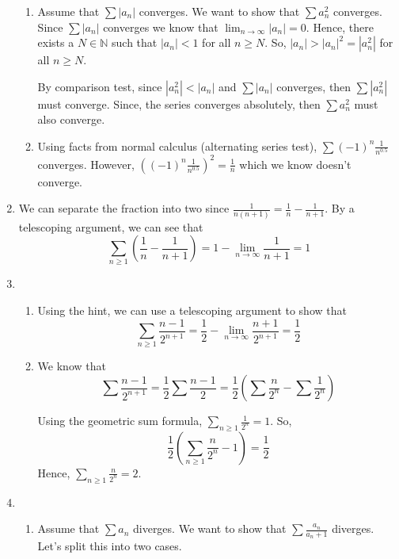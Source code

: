 \documentclass[12pt]{article}
\begin{document}
\begin{enumerate}[start=1,label={\bfseries Problem \arabic*:},leftmargin=1in]
\begin{enumerate}
        \item Assume that $\sum\left| a_{n} \right|$ converges. We want to show that $\sum a_{n}^2$ converges. 
        Since $\sum |a_{n}|$ converges we know that $\lim_{n \to \infty} \left| a_{n} \right| = 0$. Hence, there exists a $N \in \mathbb{N}$ such that $\left| a_{n} \right| < 1$ for all $n \geq N$. 
        So, $|a_{n}| > |a_{n}|^{2} = |a_{n}^2|$ for all $n \geq N$. 

        By comparison test, since $|a_{n}^{2}| < |a_{n}|$ and $\sum \left| a_{n} \right|$ converges, then $\sum \left| a_{n}^{2} \right|$ must converge. Since, the series converges absolutely, then $\sum a_{n}^2$ must also converge.
        
        \item Using facts from normal calculus (alternating series test), $\sum (-1)^{n} \frac{1}{n^{0.5}}$ converges. 
        However, $((-1)^{n}\frac{1}{n^{0.5}})^{2} = \frac{1}{n}$ which we know doesn't converge. 
    \end{enumerate}
    \item We can separate the fraction into two since $\frac{1}{n(n+1)} = \frac{1}{n} - \frac{1}{n+1}$. 
    By a telescoping argument, we can see that 
    \[
        \sum_{n \geq 1} (\frac{1}{n} - \frac{1}{n+1}) = 1 - \lim_{n \to \infty} \frac{1}{n+1} = 1
    \]

    \item \begin{enumerate}
        \item Using the hint, we can use a telescoping argument to show that 
        \[
            \sum_{n \geq 1} \frac{n-1}{2^{n+1}} = \frac{1}{2} - \lim_{n \to \infty}\frac{n+1}{2^{n+1}} = \frac{1}{2}
        \]
        \item We know that \[ \sum \frac{n-1}{2^{n+1}} = \frac{1}{2} \sum \frac{n-1}{2} = \frac{1}{2}(\sum \frac{n}{2^{n}} - \sum \frac{1}{2^{n}})\] 
        
        Using the geometric sum formula, $\sum_{n \geq 1} \frac{1}{2^{n}} = 1$. 
        So, 
        \[
        \frac{1}{2}(\sum_{n \geq 1}\frac{n}{2^{n}} - 1) = \frac{1}{2}
        \]
        Hence, $\sum_{n \geq 1} \frac{n}{2^{n}} = 2$. 

        
    \end{enumerate}
    \item \begin{enumerate}
        \item Assume that $\sum a_{n}$ diverges. We want to show that $\sum \frac{a_{n}}{a_{n} + 1}$ diverges. Let's split this into two cases. 
        

\end{enumerate}
\end{enumerate}
\end{document}
